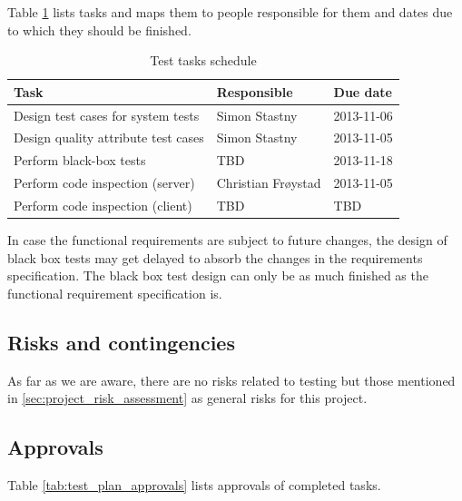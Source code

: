 \documentclass[11pt]{book}
\begin{document}
Table \ref{tab:test_plan_schedule} lists tasks and maps them to people responsible for them and dates due to which they should be finished. 

\begin{table}[H]
    \centering
    \begin{tabular}{| l | l | l |}
        \hline
        Task                                & Responsible             & Due date       \\ \hline
        Design test cases for system tests  & Simon Stastny           & 2013-11-06     \\ \hline
        Design quality attribute test cases & Simon Stastny           & 2013-11-05     \\ \hline
        Perform black-box tests             & TBD                     & 2013-11-18     \\ \hline
        Perform code inspection (server)    & Christian Frøystad      & 2013-11-05     \\ \hline
        Perform code inspection (client)    & TBD                     & TBD            \\ \hline
    \end{tabular}
    \caption{Test tasks schedule}
    \label{tab:test_plan_schedule}
\end{table}


In case the functional requirements are subject to future changes, the design of black box tests may get delayed to absorb the changes in the requirements specification. The black box test design can only be as much finished as the functional requirement specification is.

\subsection{Risks and contingencies}
As far as we are aware, there are no risks related to testing but those mentioned in \ref{sec:project_risk_assessment} as general risks for this project.

\subsection{Approvals}

Table \ref{tab:test_plan_approvals} lists approvals of completed tasks.
\end{document}
